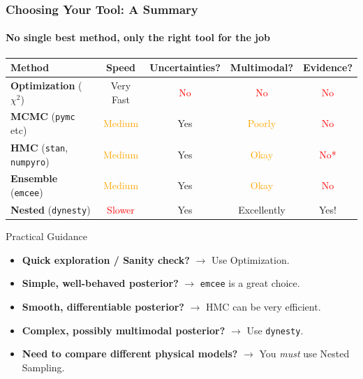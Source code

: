 \documentclass[aspectratio=169]{beamer}
\begin{document}
\begin{frame}
    \frametitle{Choosing Your Tool: A Summary}
    \framesubtitle{No single best method, only the right tool for the job}
    \begin{center}
        \begin{tabular}{|l|c|c|c|c|}
            \hline
            \textbf{Method} & \textbf{Speed} & \textbf{Uncertainties?} & \textbf{Multimodal?} & \textbf{Evidence?} \\
            \hline
            \textbf{Optimization} ($\chi^2$) & \textcolor{green!50!black}{Very Fast} & \textcolor{red}{No} & \textcolor{red}{No} & \textcolor{red}{No} \\
            \hline
            \textbf{MCMC} (\texttt{pymc} etc) & \textcolor{orange}{Medium} & \textcolor{green!50!black}{Yes} & \textcolor{orange}{Poorly} & \textcolor{red}{No} \\
            \hline
            \textbf{HMC} (\texttt{stan}, \texttt{numpyro}) & \textcolor{orange}{Medium} & \textcolor{green!50!black}{Yes} & \textcolor{orange}{Okay} & \textcolor{red}{No*} \\
            \hline
            \textbf{Ensemble} (\texttt{emcee}) & \textcolor{orange}{Medium} & \textcolor{green!50!black}{Yes} & \textcolor{orange}{Okay} & \textcolor{red}{No} \\
            \hline
            \textbf{Nested} (\texttt{dynesty}) & \textcolor{red}{Slower} & \textcolor{green!50!black}{Yes} & \textcolor{green!50!black}{Excellently} & \textcolor{green!50!black}{Yes!} \\
            \hline
        \end{tabular}
    \end{center}
    \begin{block}{Practical Guidance}
        \begin{itemize}
            \item \textbf{Quick exploration / Sanity check?} $\rightarrow$ Use Optimization.
            \item \textbf{Simple, well-behaved posterior?} $\rightarrow$ \texttt{emcee} is a great choice.
            \item \textbf{Smooth, differentiable posterior?} $\rightarrow$ HMC can be very efficient.
            \item \textbf{Complex, possibly multimodal posterior?} $\rightarrow$ Use \texttt{dynesty}.
            \item \textbf{Need to compare different physical models?} $\rightarrow$ You \textit{must} use Nested Sampling.
        \end{itemize}
    \end{block}
\end{frame}
\end{document}
